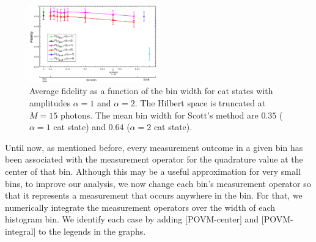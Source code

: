 \documentclass[
reprint,
superscriptaddress,
showpacs,
amsmath,
amssymb,
aps,
pra,
longbibliography
]{revtex4-1}
\begin{document}
\begin{figure}
  \includegraphics[width=0.49\textwidth]{catstate-alpha=1and2-15photons.eps}
  \caption{Average fidelity as a function of the bin width for
    cat states with amplitudes $\alpha=1$ and $\alpha=2$. The Hilbert
    space is truncated at $M=15$ photons. The mean bin width for Scott's
    method are $0.35$ ($\alpha=1$ cat state) and $0.64$ ($\alpha=2$
    cat state).}
  \label{fig-fidelity_vs_binwidth_15_photons_catstate}
\end{figure}




Until now, as mentioned before, every measurement outcome in a given 
bin has been associated with the measurement operator for the quadrature 
value at the center of that bin. Although this may be a useful approximation 
for very small bins, to improve our analysis, we now change each bin's
measurement operator so that it represents a measurement that occurs
anywhere in the bin. For that, we numerically integrate the measurement 
operators over the width of each histogram bin. We identify each case by 
adding $[$POVM-center$]$ and $[$POVM-integral$]$ to the legends in the
graphs.
\end{document}
